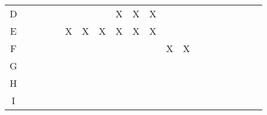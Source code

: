 \begin{enumerate}
\begin{center}
\begin{tabular}{c|c|c|c|c|c|c|c|c|c|c|c|c|c|c|c|c|c|c|c|}
D &  &  &  &  &  &  &  & X & X & X &  &  &  &  &  &  &  &  & \tabularnewline
\cline{2-20} \cline{3-20} \cline{4-20} \cline{5-20} \cline{6-20} \cline{7-20} \cline{8-20} \cline{9-20} \cline{10-20} \cline{11-20} \cline{12-20} \cline{13-20} \cline{14-20} \cline{15-20} \cline{16-20} \cline{17-20} \cline{18-20} \cline{19-20} \cline{20-20} 
E &  &  &  &  & X & X & X & X & X & X &  &  &  &  &  &  &  &  & \tabularnewline
\cline{2-20} \cline{3-20} \cline{4-20} \cline{5-20} \cline{6-20} \cline{7-20} \cline{8-20} \cline{9-20} \cline{10-20} \cline{11-20} \cline{12-20} \cline{13-20} \cline{14-20} \cline{15-20} \cline{16-20} \cline{17-20} \cline{18-20} \cline{19-20} \cline{20-20} 
F &  &  &  &  &  &  &  &  &  &  & X & X &  &  &  &  &  &  & \tabularnewline
\cline{2-20} \cline{3-20} \cline{4-20} \cline{5-20} \cline{6-20} \cline{7-20} \cline{8-20} \cline{9-20} \cline{10-20} \cline{11-20} \cline{12-20} \cline{13-20} \cline{14-20} \cline{15-20} \cline{16-20} \cline{17-20} \cline{18-20} \cline{19-20} \cline{20-20} 
G &  &  &  &  &  &  &  &  &  &  &  &  &  &  &  &  &  &  & \tabularnewline
\cline{2-20} \cline{3-20} \cline{4-20} \cline{5-20} \cline{6-20} \cline{7-20} \cline{8-20} \cline{9-20} \cline{10-20} \cline{11-20} \cline{12-20} \cline{13-20} \cline{14-20} \cline{15-20} \cline{16-20} \cline{17-20} \cline{18-20} \cline{19-20} \cline{20-20} 
H &  &  &  &  &  &  &  &  &  &  &  &  &  &  &  &  &  &  & \tabularnewline
\cline{2-20} \cline{3-20} \cline{4-20} \cline{5-20} \cline{6-20} \cline{7-20} \cline{8-20} \cline{9-20} \cline{10-20} \cline{11-20} \cline{12-20} \cline{13-20} \cline{14-20} \cline{15-20} \cline{16-20} \cline{17-20} \cline{18-20} \cline{19-20} \cline{20-20} 
I &  &  &  &  &  &  &  &  &  &  &  &  &  &  &  &  &  &  & \tabularnewline
\cline{2-20} \cline{3-20} \cline{4-20} \cline{5-20} \cline{6-20} \cline{7-20} \cline{8-20} \cline{9-20} \cline{10-20} \cline{11-20} \cline{12-20} \cline{13-20} \cline{14-20} \cline{15-20} \cline{16-20} \cline{17-20} \cline{18-20} \cline{19-20} \cline{20-20} 
\end{tabular}
\par\end{center}

\end{enumerate}